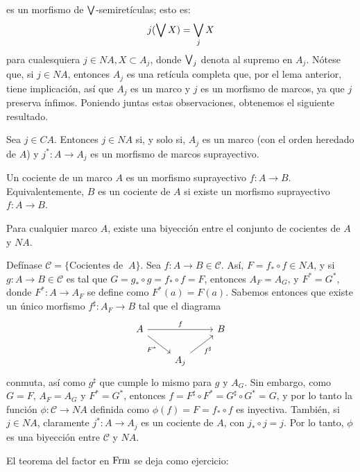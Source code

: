 es un morfismo de $\bigvee$-semiretículas; esto es:
$$j(\bigvee X)=\bigvee_jX$$
para cualesquiera $j\in NA, X\subset A_j$, donde $\bigvee_j$ denota
al supremo en $A_j$.
Nótese que, si $j\in NA$, entonces $A_j$ es una retícula completa
que, por el lema anterior, tiene implicación, así que $A_j$ es un
marco y $j$ es un morfismo de marcos, ya que $j$ preserva
ínfimos.
Poniendo juntas estas observaciones, obtenemos el siguiente
resultado.
\begin{lemma}
    Sea $j\in CA$.
    Entonces $j\in NA$ si, y solo si,
    $A_j$ es un marco (con el orden heredado de $A$)
    y $j^*:A\to A_j$ es un morfismo de marcos suprayectivo.
\end{lemma}
\begin{defn}
  Un cociente de un marco $A$ es un morfismo suprayectivo $f:A\to
  B$.
  Equivalentemente, $B$ es un cociente de $A$ si existe un
  morfismo suprayectivo $f:A\to B$.
\end{defn}

\begin{exe}%
Para cualquier marco $A$, existe una biyección entre el conjunto de cocientes de $A$ y $NA$.
\end{exe}
\begin{sol}
    Defínase $\mathcal{C}=\{\text{Cocientes de } \ A\}$. Sea $f:A\to B\in \mathcal{C}$. Así, $F=f_*\circ f\in NA$, y si $g:A\to B\in\mathcal{C}$ es tal que $G=g_*\circ g=f_*\circ f=F$, entonces $A_F=A_G$, y $F^*=G^*$, donde $F^*:A\to A_F$ se define como $F^*(a)=F(a)$. Sabemos entonces que existe un único morfismo $f^\sharp:A_F\to B$ tal que el diagrama
    \[
        \begin{tikzcd}
            A \ar[rr,"f"] \ar[dr,"F^*"'] &&  B \\
            &A_j \ar[ur,"f^\sharp"']
        \end{tikzcd}
    \]
    conmuta, así como $g^\sharp$ que cumple lo mismo para $g$ y $A_G$. Sin embargo, como $G=F$, $A_F=A_G$ y $F^*=G^*$, entonces $f=F^\sharp\circ F^*=G^\sharp\circ G^*=G$, y por lo tanto la función $\phi:\mathcal{C}\to NA$ definida como $\phi(f)=F=f_*\circ f$ es inyectiva. También, si $j\in NA$, claramente $j^*:A\to A_j$ es un cociente de $A$, con $j_*\circ j =j$. Por lo tanto, $\phi$ es una biyección entre $\mathcal{C}$ y $NA$.
\end{sol}

El teorema del factor en $\mathrm{Frm}$ se deja como ejercicio:

